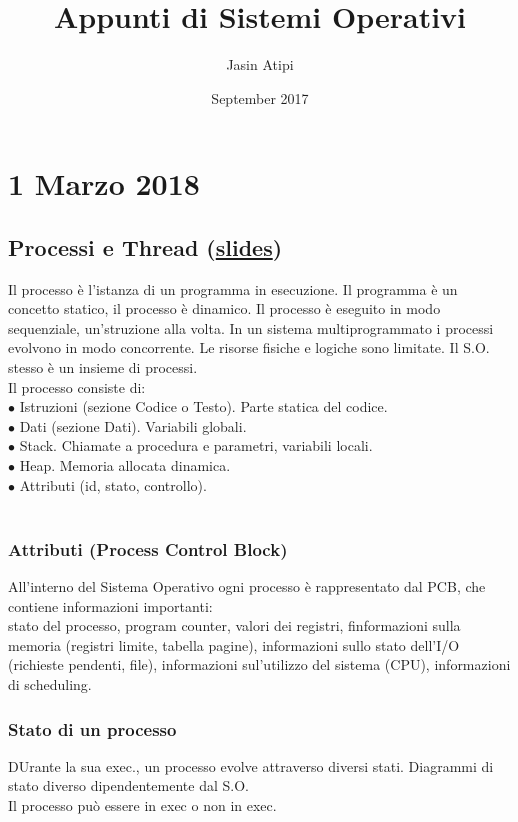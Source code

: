\documentclass{article}
\title{Appunti di Sistemi Operativi}
\author{Jasin Atipi}
\date{September 2017}
\begin{document}
\maketitle

\section*{1 Marzo 2018}
\subsection*{Processi e Thread (\href{https://didatticaonline.unitn.it/dol/pluginfile.php/368856/mod_resource/content/1/05-Processi_e_Thread.pdf}{slides})}
Il processo \`{e} l'istanza di un programma in esecuzione. Il programma \`{e} un concetto statico, il processo \`{e} dinamico. Il processo \`{e} eseguito in modo sequenziale, un'struzione alla volta. In un sistema multiprogrammato i processi evolvono in modo concorrente. Le risorse fisiche e logiche sono limitate. Il S.O. stesso \`{e} un insieme di processi.\\
Il processo consiste di:\\
$\bullet$ Istruzioni (sezione Codice o Testo). Parte statica del codice.\\
$\bullet$ Dati (sezione Dati). Variabili globali.\\
$\bullet$ Stack. Chiamate a procedura e parametri, variabili locali.\\
$\bullet$ Heap. Memoria allocata dinamica.\\
$\bullet$ Attributi (id, stato, controllo).\\
\\
\subsubsection*{Attributi (Process Control Block)}
All'interno del Sistema Operativo ogni processo \`{e} rappresentato dal PCB, che contiene informazioni importanti:\\
stato del processo, program counter, valori dei registri, finformazioni sulla memoria (registri limite, tabella pagine), informazioni sullo stato dell'I/O (richieste pendenti, file), informazioni sul'utilizzo del sistema (CPU), informazioni di scheduling.\\
\subsubsection*{Stato di un processo}
DUrante la sua exec., un processo evolve attraverso diversi stati. Diagrammi di stato diverso dipendentemente dal S.O.\\
Il processo pu\`{o} essere in exec o non in exec.\\
\end{document}
